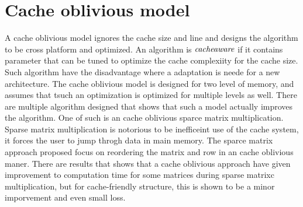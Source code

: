 \section{Cache oblivious model} 
A cache oblivious model ignores the cache size and line and designs the algorithm to be cross platform and optimized. An algorithm is $\it{cache aware}$ if it contains parameter that can be tuned to optimize the cache complexiity for the cache size\cite{CacheObli1999}. Such algorithm have the disadvantage where a adaptation is neede for a new architecture\cite{COmultiplic2009}. The cache oblivious model is designed for two level of memory, and assumes that tsuch an optimization is optimized for multiple levels as well. There are multiple algorithm designed that shows that such a model actually improves the algorithm. One of such is an cache oblivious sparce matrix multiplication. Sparse matrix multiplication is notorious to be inefficeint use of the cache system, it forces the user to jump throgh data in main memory\cite{COmuliplic2009}. The sparce matrix approach proposed \cite{COmultiplic2009} focus on reordering the matrix and row in an cache oblivious maner. There are results that shows that a cache oblivious approach have given improvement to computation time for some matrices during sparse matrixc multiplication, but for cache-friendly structure, this is shown to be a minor imporvement and even small loss. 